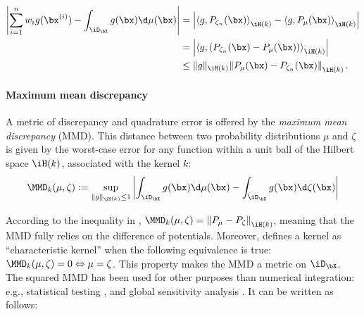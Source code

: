 \begin{subequations}
\begin{align}
    \left| \sum_{i=1}^{n} w_i g(\bx^{(i)}) - \int_{\iD_{\bX}} g(\bx) \d \mu(\bx) \right| &= \left| \left\langle g, P_{\zeta_n}(\bx) \right\rangle_{\iH(k)} - \left\langle g, P_{\mu}(\bx) \right\rangle_{\iH(k)} \right| \\
    &= \left| \left\langle g, \left(P_{\zeta_n}(\bx) - P_{\mu}(\bx)\right) \right\rangle_{\iH(k)} \right|\\
    &\leq \lVert g \lVert_{\iH(k)}  \left\lVert P_{\mu}(\bx) - P_{\zeta_n}(\bx) \right\lVert_{\iH(k)}.
    \label{eq:quad_error}
\end{align}
\end{subequations}

\paragraph{Maximum mean discrepancy}
A metric of discrepancy and quadrature error is offered by the \emph{maximum mean discrepancy} (MMD). 
This distance between two probability distributions $\mu$ and $\zeta$ is given by the worst-case error for any function within a unit ball of the Hilbert space $\iH(k)$, associated with the kernel $k$:
\begin{equation}
    \MMD_k(\mu, \zeta) := %
    \sup_{\lVert g \lVert_{\iH(k)} \leq 1}
            \left | \int_{\iD_{\bX}} g(\bx) \d \mu(\bx) - \int_{\iD_{\bX}} g(\bx) \d \zeta(\bx) \right| %
    \label{eq:mmd}  
\end{equation}

According to the inequality in , $\MMD_k(\mu, \zeta) = \left\lVert P_{\mu} - P_{\zeta} \right\lVert_{\iH(k)}$, meaning that the MMD fully relies on the difference of potentials. 
Moreover, \cite{sriperumbudur_2010} defines a kernel as ``characteristic kernel'' when the following equivalence is true: $\MMD_k(\mu, \zeta) = 0 \Leftrightarrow \mu = \zeta$. 
This property makes the MMD a metric on $\iD_{\bX}$. 
The squared MMD has been used for other purposes than numerical integration: e.g., statistical testing \citep{gretton_2006}, and global sensitivity analysis \citep{daveiga_2015}. 
It can be written as follows:

